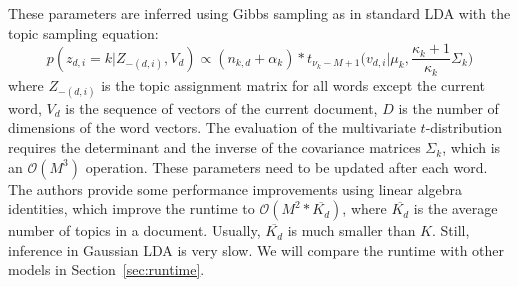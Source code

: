 \documentclass[
        a4paper,
        titlepage,
        twoside,
        parskip,
        numbers=noenddot
        ]{scrbook}
\theoremstyle{break}
\begin{document}
These parameters are inferred using Gibbs sampling as in standard LDA with the topic sampling equation: %
\begin{equation*}
  p(z_{d,i} = k | Z_{-(d,i)}, V_d) \propto (n_{k,d} + \alpha_k) * t_{\nu_k - M + 1}\Big(v_{d,i} \Big| \mu_k, \frac{\kappa_k + 1}{\kappa_k} \Sigma_k\Big)
\end{equation*}
where $Z_{-(d,i)}$ is the topic assignment matrix for all words except the current word, $V_d$ is the sequence of vectors of the current document, $D$ is the number of dimensions of the word vectors.
The evaluation of the multivariate $t$-distribution requires the determinant and the inverse of the covariance matrices $\Sigma_k$, which is an $\mathcal{O}(M^3)$ operation.
These parameters need to be updated after each word.
The authors provide some performance improvements using linear algebra identities, which improve the runtime to $\mathcal{O}(M^2 * \overline{K_d})$, where $\overline{K_d}$ is the average number of topics in a document.
Usually, $\overline{K_d}$ is much smaller than $K$.
Still, inference in Gaussian LDA is very slow.
We will compare the runtime with other models in Section~\ref{sec:runtime}.
\end{document}
